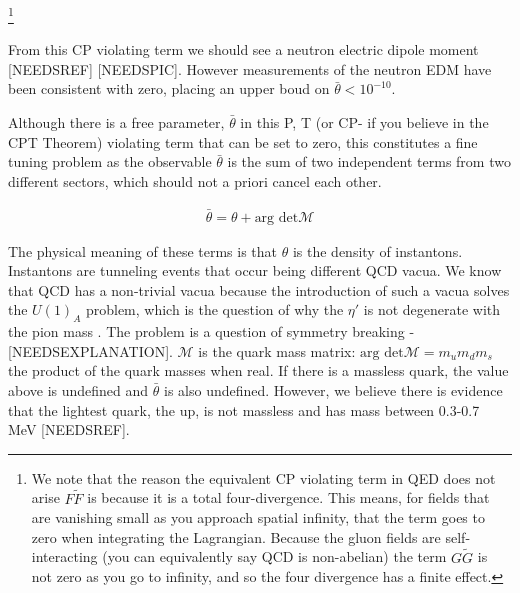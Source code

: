 \documentclass[12pt,twosides]{book}
\begin{document}
\footnote{We note that the reason the equivalent CP violating term in QED does not arise $F\tilde F$ is because it is a total four-divergence. This means, for fields that are vanishing small as you approach spatial infinity, that the term goes to zero when integrating the Lagrangian. Because the gluon fields are self-interacting (you can equivalently say QCD is non-abelian) the term $G \tilde G$ is not zero as you go to infinity, and so the four divergence has a finite effect.}

 From this CP violating term we should see a neutron electric dipole moment [NEEDSREF] [NEEDSPIC]. However measurements of the neutron EDM have been consistent with zero, placing an upper boud on $\bar \theta < 10^{-10}$.

Although there is a free parameter, $\bar \theta$ in this P, T (or CP- if you believe in the CPT Theorem) violating term that can be set to zero, this constitutes a fine tuning problem as the observable $\bar \theta$ is the sum of two independent terms from two different sectors, which should not a priori cancel each other.

\begin{align*}
\bar \theta = \theta + \text{arg det} \mathcal{M}
\end{align*}

The physical meaning of these terms is that $\theta$ is the density of instantons. Instantons are tunneling events that occur being different QCD vacua. We know that QCD has a non-trivial vacua because the introduction of such a vacua solves the $U(1)_A$ problem, which is the question of why the $\eta'$ is not degenerate with the pion mass \cite{thooft76}. The problem is a question of symmetry breaking - [NEEDSEXPLANATION]. $\mathcal{M}$ is the quark mass matrix: $\text{arg det} \mathcal{M} = m_um_dm_s$ the product of the quark masses when real. If there is a massless quark, the value above is undefined and $\bar \theta$ is also undefined. However, we believe there is evidence that the lightest quark, the up, is not massless and has mass between 0.3-0.7 MeV [NEEDSREF].
\end{document}
